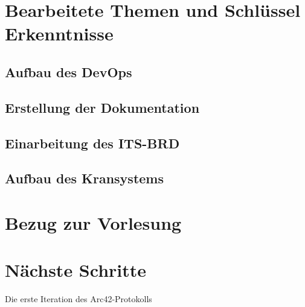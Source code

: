 \documentclass{article}
\begin{document}
\section{Bearbeitete Themen und Schlüssel Erkenntnisse}
\subsection{Aufbau des DevOps}
\subsection{Erstellung der Dokumentation}
\subsection{Einarbeitung des ITS-BRD}
\subsection{Aufbau des Kransystems}



\section{Bezug zur Vorlesung}


\section{Nächste Schritte}
Die erste Iteration des Arc42-Protokolls
\end{document}
